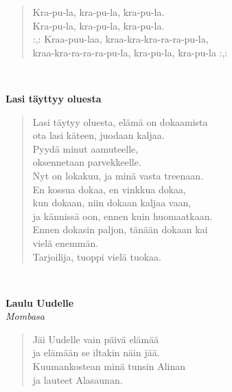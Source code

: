 \noindent\begin{minipage}{\linewidth}
\begin{verse}
	Kra-pu-la, kra-pu-la, kra-pu-la.\\
	Kra-pu-la, kra-pu-la, kra-pu-la.\\
	\hspace{0pt-\widthof{:,: }}:,: Kraa-puu-laa, kraa-kra-kra-ra-ra-pu-la,\\
	kraa-kra-ra-ra-ra-pu-la, kra-pu-la, kra-pu-la :,:\\
\end{verse}
\end{minipage}\\[10pt]
%
%
\noindent\begin{minipage}{\linewidth}
\vspace{5pt}
\parbox[t]{0.85\linewidth}{\raggedright {\large\bf Lasi täyttyy oluesta}\\[6pt]}
\begin{verse}
	Lasi täytyy oluesta, elämä on dokaamista\\
	ota lasi käteen, juodaan kaljaa.\\
	Pyydä minut aamuteelle,\\
	oksennetaan parvekkeelle.\\
	Nyt on lokakuu, ja minä vasta treenaan.\\
	En kossua dokaa, en vinkkua dokaa,\\
	kun dokaan, niin dokaan kaljaa vaan,\\
	ja kännissä oon, ennen kuin huomaatkaan.\\
	Ennen dokasin paljon, tänään dokaan kai\\
	vielä enemmän.\\
	Tarjoilija, tuoppi vielä tuokaa.\\
\end{verse}
\end{minipage}\\[10pt]
%
%
\noindent\begin{minipage}{\linewidth}
\vspace{5pt}
\parbox[t]{0.85\linewidth}{\raggedright {\large\bf Laulu Uudelle}\\[2pt]\small\emph{Mombasa}\\[6pt]}
\begin{verse}
	
	Jäi Uudelle vain päivä elämää\\
	ja elämään se iltakin näin jää.\\
	Kuumankostean minä tunsin Alinan\\
	ja lauteet Alasaunan.\\
\end{verse}
\end{minipage}\\[10pt]
